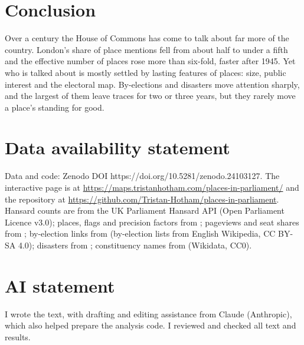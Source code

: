 \documentclass[11pt,a4paper]{article}
\begin{document}
\section{Conclusion}\label{sec:conc}
Over a century the House of Commons has come to talk about far more of the country. London's share of place mentions fell from about half to under a fifth and the effective number of places rose more than six-fold, faster after 1945. Yet who is talked about is mostly settled by lasting features of places: size, public interest and the electoral map. By-elections and disasters move attention sharply, and the largest of them leave traces for two or three years, but they rarely move a place's standing for good.

\section*{Data availability statement}
Data and code: Zenodo DOI https://doi.org/10.5281/zenodo.24103127. The interactive page is at \url{https://maps.tristanhotham.com/places-in-parliament/} and the repository at \url{https://github.com/Tristan-Hotham/places-in-parliament}. Hansard counts are from the UK Parliament Hansard API (Open Parliament Licence v3.0); places, flags and precision factors from \citet{hotham2026a}; pageviews and seat shares from \citet{hotham2026b}; by-election links from \citet{hotham2026c} (by-election lists from English Wikipedia, CC BY-SA 4.0); disasters from \citet{hotham2026d}; constituency names from \citet{hotham2026e} (Wikidata, CC0).

\section*{AI statement}
I wrote the text, with drafting and editing assistance from Claude (Anthropic), which also helped prepare the analysis code. I reviewed and checked all text and results.
\end{document}
